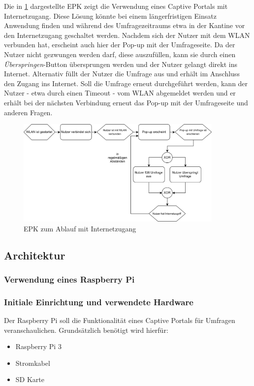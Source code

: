 Die in \ref{fig:captive_epk2} dargestellte EPK zeigt die Verwendung eines Captive Portals mit Internetzugang. Diese Lösung könnte bei einem längerfristigen Einsatz Anwendung finden und während des Umfragezeitraums etwa in der Kantine vor den Internetzugang geschaltet werden. Nachdem sich der Nutzer mit dem WLAN verbunden hat, erscheint auch hier der Pop-up mit der Umfrageseite. Da der Nutzer nicht gezwungen werden darf, diese auszufüllen, kann sie durch einen \textit{Überspringen}-Button übersprungen werden und der Nutzer gelangt direkt ins Internet. Alternativ füllt der Nutzer die Umfrage aus und erhält im Anschluss den Zugang ins Internet. Soll die Umfrage erneut durchgeführt werden, kann der Nutzer - etwa durch einen Timeout - vom WLAN abgemeldet werden und er erhält bei der nächsten Verbindung erneut das Pop-up mit der Umfrageseite und anderen Fragen.

\begin{figure}[H]
\centering
\includegraphics[width=0.9\textwidth]{images/captiveportal_EPK2}
\caption[EPK zum Ablauf mit Internetzugang]{EPK zum Ablauf mit Internetzugang}
\label{fig:captive_epk2}
\end{figure}

 
\subsection{Architektur}
\subsubsection{Verwendung eines Raspberry Pi}
\subsubsection*{Initiale Einrichtung und verwendete Hardware}
Der Raspberry Pi soll die Funktionalität eines Captive Portals für Umfragen veranschaulichen. Grundsätzlich benötigt wird hierfür:
\begin{itemize}
\item Raspberry Pi 3
\item Stromkabel
\item SD Karte
\end{itemize}

